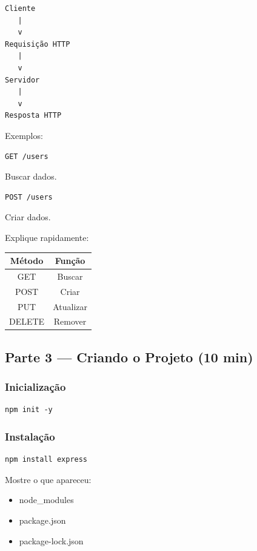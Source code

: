 \documentclass[a4paper,12pt]{article}
\begin{document}
\begin{verbatim}
Cliente
   |
   v
Requisição HTTP
   |
   v
Servidor
   |
   v
Resposta HTTP
\end{verbatim}

Exemplos:

\begin{verbatim}
GET /users
\end{verbatim}

Buscar dados.

\begin{verbatim}
POST /users
\end{verbatim}

Criar dados.

Explique rapidamente:

\begin{center}
\begin{tabular}{|c|c|}
\hline
Método & Função \\
\hline
GET & Buscar \\
POST & Criar \\
PUT & Atualizar \\
DELETE & Remover \\
\hline
\end{tabular}
\end{center}

\subsection{Parte 3 --- Criando o Projeto (10 min)}

\subsubsection{Inicialização}

\begin{verbatim}
npm init -y
\end{verbatim}

\subsubsection{Instalação}

\begin{verbatim}
npm install express
\end{verbatim}

Mostre o que apareceu:

\begin{itemize}
    \item node\_modules
    \item package.json
    \item package-lock.json
\end{itemize}
\end{document}
